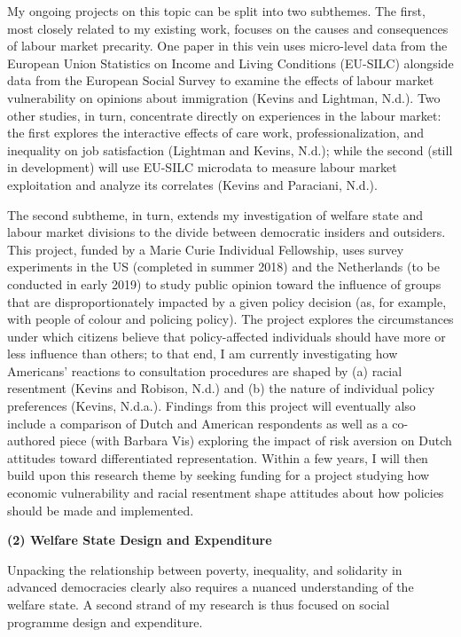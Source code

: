 \documentclass[letterpaper]{scrartcl}
\begin{document}
  My ongoing projects on this topic can be split into two subthemes. The first, most closely related to my existing work, focuses on the causes and consequences of labour market precarity. One paper in this vein uses micro-level data from the European Union Statistics on Income and Living Conditions (EU-SILC) alongside data from the European Social Survey to examine the effects of labour market vulnerability on opinions about immigration (Kevins and Lightman, N.d.). Two other studies, in turn, concentrate directly on experiences in the labour market: the first explores the interactive effects of care work, professionalization, and inequality on job satisfaction (Lightman and Kevins, N.d.); while the second (still in development) will use EU-SILC microdata to measure labour market exploitation and analyze its correlates (Kevins and Paraciani, N.d.).

  The second subtheme, in turn, extends my investigation of welfare state and labour market divisions to the divide between democratic insiders and outsiders. This project, funded by a Marie Curie Individual Fellowship, uses survey experiments in the US (completed in summer 2018) and the Netherlands (to be conducted in early 2019) to study public opinion toward the influence of groups that are disproportionately impacted by a given policy decision (as, for example, with people of colour and policing policy). The project explores the circumstances under which citizens believe that policy-affected individuals should have more or less influence than others; to that end, I am currently investigating how Americans' reactions to consultation procedures are shaped by (a) racial resentment (Kevins and Robison, N.d.) and (b) the nature of individual policy preferences (Kevins, N.d.a.). Findings from this project will eventually also include a comparison of Dutch and American respondents as well as a co-authored piece (with Barbara Vis) exploring the impact of risk aversion on Dutch attitudes toward differentiated representation. Within a few years, I will then build upon this research theme by seeking funding for a project studying how economic vulnerability and racial resentment shape attitudes about how policies should be made and implemented.

  \textbf{(2) Welfare State Design and Expenditure}
  \vspace{-1em}

  Unpacking the relationship between poverty, inequality, and solidarity in advanced democracies clearly also requires a nuanced understanding of the welfare state. A second strand of my research is thus focused on social programme design and expenditure.
\end{document}
